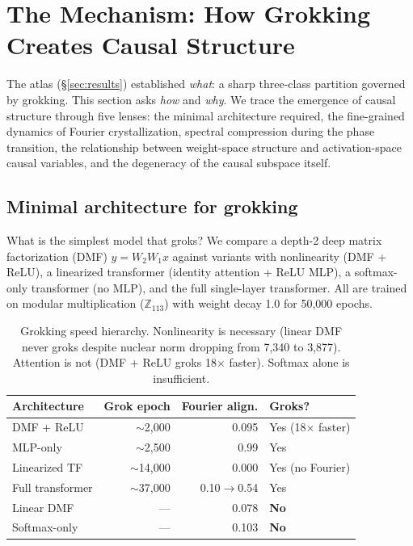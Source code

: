 \documentclass{article}
\newcommand{\Z}{\mathbb{Z}}
\begin{document}
\section{The Mechanism: How Grokking Creates Causal Structure}
\label{sec:mechanism}

The atlas (\S\ref{sec:results}) established \emph{what}: a sharp three-class
partition governed by grokking. This section asks \emph{how} and \emph{why}.
We trace the emergence of causal structure through five lenses: the minimal
architecture required, the fine-grained dynamics of Fourier crystallization,
spectral compression during the phase transition, the relationship between
weight-space structure and activation-space causal variables, and the
degeneracy of the causal subspace itself.

\subsection{Minimal architecture for grokking}
\label{sec:dmf}

What is the simplest model that groks? We compare a depth-2 deep matrix
factorization (DMF) $y = W_2 W_1 x$ against variants with nonlinearity
(DMF + ReLU), a linearized transformer (identity attention + ReLU MLP),
a softmax-only transformer (no MLP), and the full single-layer transformer.
All are trained on modular multiplication ($\Z_{113}$) with weight decay 1.0
for 50{,}000 epochs.

\begin{table}[t]
\centering
\small
\begin{tabular}{lrrl}
\toprule
Architecture & Grok epoch & Fourier align. & Groks? \\
\midrule
DMF + ReLU     & $\sim$2{,}000   & 0.095 & Yes (18$\times$ faster) \\
MLP-only       & $\sim$2{,}500   & 0.99  & Yes \\
Linearized TF  & $\sim$14{,}000  & 0.000 & Yes (no Fourier) \\
Full transformer & $\sim$37{,}000 & 0.10$\to$0.54 & Yes \\
Linear DMF     & ---          & 0.078 & \textbf{No} \\
Softmax-only   & ---          & 0.103 & \textbf{No} \\
\bottomrule
\end{tabular}
\caption{Grokking speed hierarchy. Nonlinearity is necessary (linear DMF never
groks despite nuclear norm dropping from 7{,}340 to 3{,}877). Attention is not
(DMF + ReLU groks 18$\times$ faster). Softmax alone is insufficient.}
\label{tab:grokking_speed}
\end{table}
\end{document}
